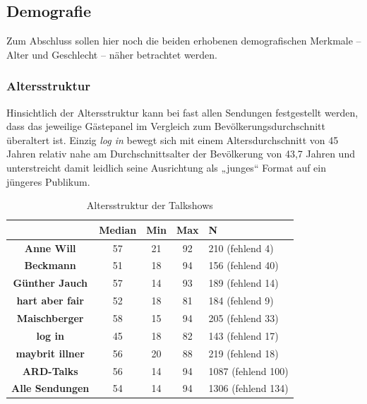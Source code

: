 \subsection{Demografie}\label{chap:demografie}

Zum Abschluss sollen hier noch die beiden erhobenen demografischen Merkmale – Alter und Geschlecht – näher betrachtet werden.

\subsubsection{Altersstruktur}

Hinsichtlich der Altersstruktur kann bei fast allen Sendungen festgestellt werden, dass das jeweilige Gästepanel im Vergleich zum Bevölkerungsdurchschnitt überaltert ist. Einzig \textit{log in} bewegt sich mit einem Altersdurchschnitt von 45 Jahren relativ nahe am Durchschnittsalter der Bevölkerung von 43,7 Jahren und unterstreicht damit leidlich seine Ausrichtung als „junges“ Format auf ein jüngeres Publikum.

\begin{table}[ht]
	\centering
	\caption{Altersstruktur der Talkshows}
		\begin{tabular}{@{}ccccl@{}}
			\toprule
			& \textbf{Median} & \textbf{Min} & \textbf{Max} & \textbf{N}         \\ \midrule
			\textbf{Anne Will}      & 57              & 21           & 92           & 210 (fehlend 4)    \\
			\textbf{Beckmann}       & 51              & 18           & 94           & 156 (fehlend 40)   \\
			\textbf{Günther Jauch} & 57              & 14           & 93           & 189 (fehlend 14)   \\
			\textbf{hart aber fair} & 52              & 18           & 81           & 184 (fehlend 9)    \\
			\textbf{Maischberger}   & 58              & 15           & 94           & 205 (fehlend 33)   \\
			\textbf{log in}         & 45              & 18           & 82           & 143 (fehlend 17)   \\
			\textbf{maybrit illner} & 56              & 20           & 88           & 219 (fehlend 18)   \\ \midrule
			\textbf{ARD-Talks}      & 56              & 14           & 94           & 1087 (fehlend 100) \\
			\textbf{Alle Sendungen} & 54              & 14           & 94           & 1306 (fehlend 134) \\ \bottomrule
		\end{tabular}%
	\label{tab:altersstruktur}
\end{table}

